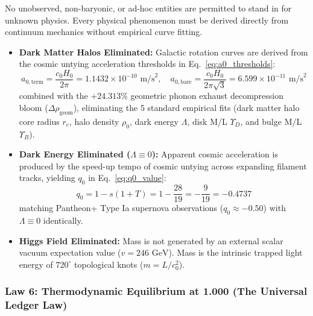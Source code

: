 \documentclass[11pt,a4paper]{article}
\begin{document}
No unobserved, non-baryonic, or ad-hoc entities are permitted to stand in for unknown physics. Every physical phenomenon must be derived directly from continuum mechanics without empirical curve fitting.
\begin{itemize}
    \item \textbf{Dark Matter Halos Eliminated:} Galactic rotation curves are derived from the cosmic untying acceleration thresholds in Eq.~\eqref{eq:a0_thresholds}:
    \begin{equation}
    a_{0,\text{term}} = \frac{c_0 H_0}{2\pi} = 1.1432 \times 10^{-10}\text{ m/s}^2, \quad a_{0,\text{bare}} = \frac{c_0 H_0}{2\pi\sqrt{3}} = 6.599 \times 10^{-11}\text{ m/s}^2
    \label{eq:a0_thresholds}
    \end{equation}
    combined with the $+24.313\%$ geometric phonon exhaust decompression bloom ($\Delta\rho_{\text{geom}}$), eliminating the 5 standard empirical fits (dark matter halo core radius $r_c$, halo density $\rho_0$, dark energy $\Lambda$, disk M/L $\Upsilon_D$, and bulge M/L $\Upsilon_B$).
    \item \textbf{Dark Energy Eliminated ($\Lambda \equiv 0$):} Apparent cosmic acceleration is produced by the speed-up tempo of cosmic untying across expanding filament tracks, yielding $q_0$ in Eq.~\eqref{eq:q0_value}:
    \begin{equation}
    q_0 = 1 - s(1 + T) = 1 - \frac{28}{19} = -\frac{9}{19} = -0.4737
    \label{eq:q0_value}
    \end{equation}
    matching Pantheon+ Type Ia supernova observations ($q_0 \approx -0.50$) with $\Lambda \equiv 0$ identically.
    \item \textbf{Higgs Field Eliminated:} Mass is not generated by an external scalar vacuum expectation value ($v = 246\text{ GeV}$). Mass is the intrinsic trapped light energy of $720^\circ$ topological knots ($m = L/c_0^2$).
\end{itemize}

\subsubsection{Law 6: Thermodynamic Equilibrium at 1.000 (The Universal Ledger Law)}
\label{subsubsec:law_6_thermo_equilibrium}
\end{document}
